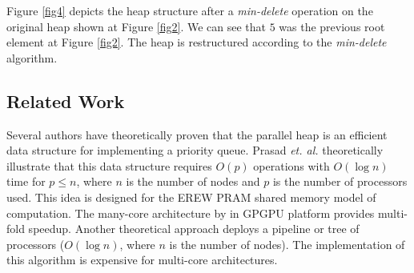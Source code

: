 \documentclass[10pt, conference, compsocconf]{IEEEtran}
\begin{document}
Figure \ref{fig4} depicts the heap structure after a {\it min-delete} operation on the original heap shown at Figure \ref{fig2}.
We can see that $5$ was the previous root element at Figure \ref{fig2}.
The heap is restructured according to the {\it min-delete} algorithm.


\subsection{Related Work}
Several authors have theoretically proven that the parallel heap is an efficient data structure for implementing a priority queue.
Prasad {\it et. al.} \cite{pq0,pq3} theoretically illustrate that this data structure requires $O(p)$ operations with $O(\log n)$ time for $p \leq n$, where $n$ is the number of nodes and $p$ is the number of processors used.
This idea is designed for the EREW PRAM shared memory model of computation.
The many-core architecture by \cite{pq2} in GPGPU platform provides multi-fold speedup.
Another theoretical approach \cite{pq4} deploys a pipeline or tree of processors ($O(\log n)$, where $n$ is the number of nodes).
The implementation of this algorithm \cite{pq5} is expensive for multi-core architectures.
\end{document}
